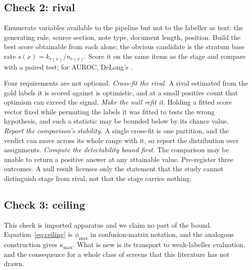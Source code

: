 \documentclass[review]{elsarticle}
\begin{document}
\subsection{Check 2: rival}

Enumerate variables available to the pipeline but not to the labeller as text:
the generating rule, source section, note type, document length, position. Build the best score obtainable from each alone; the obvious candidate is the
stratum base rate $s(x) = k_{r(x)}/n_{r(x)}$. Score it on the same items as the
stage and compare with a paired test; for AUROC, DeLong's
\cite{delong1988comparing}.

Four requirements are not optional. \emph{Cross-fit the rival.} A rival estimated from the gold labels it is scored
against is optimistic, and at a small positive count that optimism can exceed
the signal.
\emph{Make the null refit it.} Holding a fitted score vector fixed while
permuting the labels it was fitted to tests the wrong hypothesis, and such a
statistic may be bounded below by its chance value.
\emph{Report the comparison's stability.} A single cross-fit is one partition, and
the verdict can move across its whole range with it, so report the distribution
over assignments.
\emph{Compute the detectability bound first.} The comparison may be unable to
return a positive answer at any attainable value. Pre-register three outcomes. A null result licenses only the statement that the
study cannot distinguish stage from rival, not that the stage carries nothing.

\subsection{Check 3: ceiling}

This check is imported apparatus and we claim no part of the bound.
Equation~\ref{eq:ceiling} is $\phi_{\max}$ in confusion-matrix notation, and the
analogous construction gives $\kappa_{\max}$. What is new is its transport to
weak-labeller evaluation, and the consequence for a whole class of screens that
this literature has not drawn.
\end{document}
